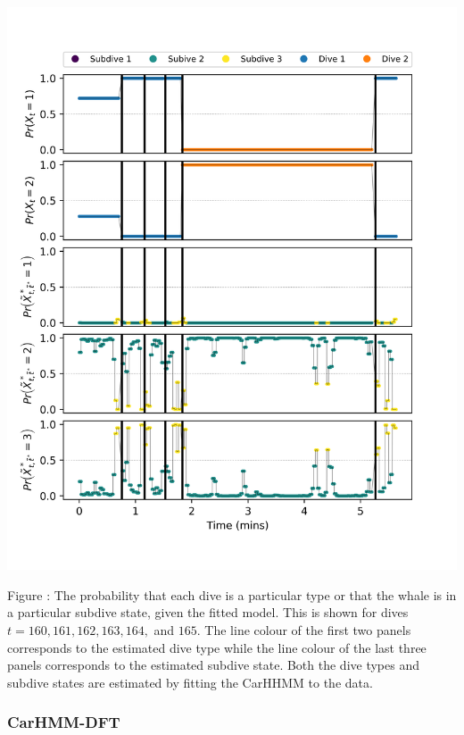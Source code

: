 \documentclass{article}
\begin{document}
        \begin{center}
        \includegraphics[width=6in]{../Plots/CarHHMM1_decoded_states.png}
        \end{center}
        
        \noindent Figure : The probability that each dive is a particular type or that the whale is in a particular subdive state, given the fitted model. This is shown for dives $t = 160,161,162,163,164,$ and $165$. The line colour of the first two panels corresponds to the estimated dive type while the line colour of the last three panels corresponds to the estimated subdive state. Both the dive types and subdive states are estimated by fitting the CarHHMM to the data.
        \addtocounter{fignum}{1}
        
        \subsubsection{CarHMM-DFT}
        
\end{document}
